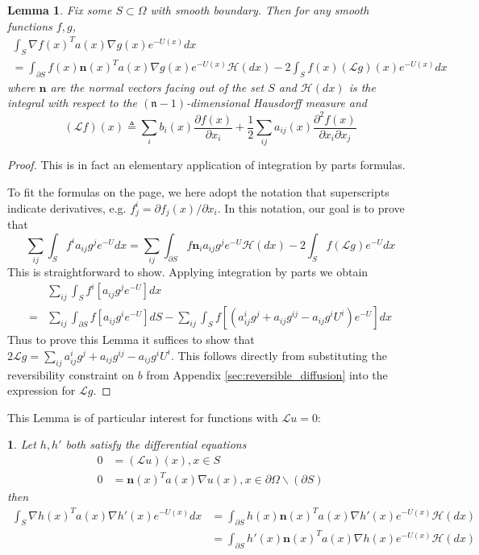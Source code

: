 \documentclass[english, aip, jcp, priprint, graphicx,floatfix]{revtex4-1}
\newtheorem{lemma}{Lemma}
\theoremstyle{plain}
\theoremstyle{definition}
\theoremstyle{plain}
\newtheorem{cor}[thm]{\protect\corollaryname}
\newcommand{\dimension}{{\mathfrak{n}}}
\newcommand{\hausdorffmeasure}{\mathscr{H}(dx)}
\providecommand{\corollaryname}{Corollary}
\begin{document}
\begin{lemma}  \label{lem:greenident}Fix some $S \subset \Omega$ with smooth boundary.  Then for any smooth functions $f,g$,
\begin{gather*}
\int_{S} \nabla f(x)^T a(x) \nabla g(x) e^{-U(x)}dx \\
= \int_{\partial S} f(x) \mathbf{n}(x)^T a(x) \nabla g(x) e^{-U(x)}\hausdorffmeasure - 2\int_{S} f(x) (\mathcal{L}g)(x)e^{-U(x)}dx
\end{gather*}
where $\mathbf{n}$ are the normal vectors facing out of the set $S$ and $\hausdorffmeasure$ is the integral with respect to the $(\dimension-1)$-dimensional Hausdorff measure and 
\[
(\mathcal{L}f)(x) \triangleq \sum_i b_i(x) \frac{\partial f (x)}{\partial x_i} + 
    \frac{1}{2} \sum_{ij}a_{ij}(x)\frac{\partial^2 f(x)}{\partial x_i \partial x_j} 
\]
\end{lemma}
\begin{proof}
This is in fact an elementary application of integration by parts formulas.  

To fit the formulas on the page, we here adopt the notation that superscripts indicate derivatives, e.g. $f^i_j  = \partial f_j(x)/\partial x_i$.  In this notation, our goal is to prove that
\[
\sum_{ij} \int_{S} f^i a_{ij} g^j e^{-U}dx 
= \sum_{ij}\int_{\partial S} f \mathbf{n}_i a_{ij} g^j e^{-U}\hausdorffmeasure - 2\int_{S} f (\mathcal{L}g)e^{-U}dx
\]
This is straightforward to show.  Applying integration by parts we obtain
    \begin{align*}
    &\sum_{ij} \int_{S} f^i \left[a_{ij} g^j e^{-U}\right]dx \\ 
    =&\sum_{ij} \int_{\partial S} f \left[a_{ij} g^i e^{-U}\right]dS - 
            \sum_{ij}\int_{S} f  \left[(a^i_{ij} g^j +a_{ij} g^{ij} - a_{ij} g^i U^i) e^{-U}\right]dx
    \end{align*}
Thus to prove this Lemma it suffices to show that $2\mathcal{L}g=\sum_{ij}a^i_{ij} g^j +a_{ij} g^{ij} - a_{ij} g^i U^i$.  This follows directly from substituting the reversibility constraint on $b$ from Appendix \ref{sec:reversible_diffusion} into the expression for $\mathcal{L}g$.
\end{proof}

This Lemma is of particular interest for functions with $\mathcal Lu=0$:

\begin{cor}\label{cor:greenident}
Let $h,h'$ both satisfy the differential equations
\begin{align*}
0 &= (\mathcal{L}u)(x) ,x\in S \\
0 &= \mathbf{n}(x)^Ta(x)\nabla u(x), x \in \partial{\Omega} \backslash (\partial S)
\end{align*}
then
\begin{align*}
\int_{S} \nabla h(x)^T a(x) \nabla h'(x) e^{-U(x)}dx 
    &= \int_{\partial S} h(x) \mathbf{n}(x)^T a(x) \nabla h'(x) e^{-U(x)}\hausdorffmeasure \\
    &= \int_{\partial S} h'(x) \mathbf{n}(x)^T a(x) \nabla h(x) e^{-U(x)}\hausdorffmeasure
\end{align*}
\end{cor}
\end{document}
